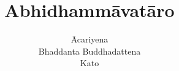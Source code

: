 \documentclass[]{Abhidhammāvatāra} %
\title{\textbf{Abhidhammāvatāro}} %
\author{%
    Ācariyena\\ %
    Bhaddanta Buddhadattena\\ %
    Kato %
}
\date{} %
\begin{document}

\frontmatter

\maketitle %
\cleardoublepage %




\setcounter{tocdepth}{0} %
\renewcommand{\contentsname}{Brief Contents} %
\tableofcontents %

\renewcommand{\contentsname}{Detailed Contents} %




\mainmatter


\end{document}
